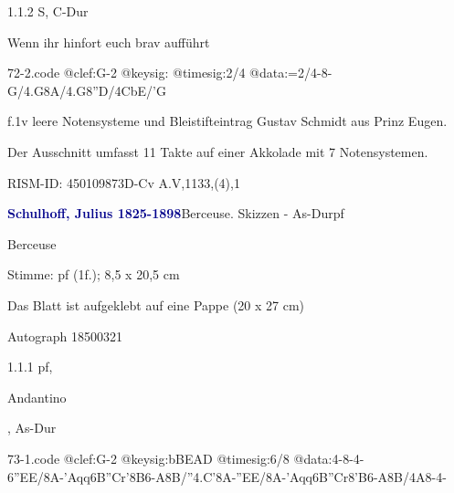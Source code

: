 \documentclass[a4paper, twocolumn, 11pt]{book}
\begin{document}
\newline %
\par 1.1.2  S, C-Dur\newline \begin{footnotesize} Wenn ihr hinfort euch brav aufführt \end{footnotesize}  
\begin{filecontents*}{72-2.code}
@clef:G-2
@keysig:
@timesig:2/4
@data:=2/4-8-G/4.G8A/4.G8''D/4CbE/'G
\end{filecontents*}

\newline %
\par f.1v leere Notensysteme und Bleistifteintrag {\textquotedbl}Gustav Schmidt aus Prinz Eugen.{\textquotedbl}
\par Der Ausschnitt umfasst 11 Takte auf einer Akkolade mit 7 Notensystemen.
\par RISM-ID: 450109873\newline D-Cv  A.V,1133,(4),1
\par \vspace{16pt} \textcolor{darkblue}{\textbf{Schulhoff, Julius  1825-1898}}\hfillplus{[73]}\newline Berceuse. Skizzen - As-Dur\newline pf
\par \begin{itshape} Berceuse\end{itshape} 
\par \textcolor{darkblue}{}  Stimme: pf  (1f.); 8,5 x 20,5 cm\newline \begin{small} Das Blatt ist aufgeklebt auf eine Pappe (20 x 27 cm)\end{small} \newline Autograph  18500321
\par 1.1.1  pf, \begin{itshape}Andantino\end{itshape}, As-Dur  
\begin{filecontents*}{73-1.code}
@clef:G-2
@keysig:bBEAD
@timesig:6/8
@data:4-8-4-6''{EE}/8A-'Aqq{6B''C}r{'8B6-A8B}/''4.C'8A-''{EE}/8A-'Aqq{6B''C}r{8'B6-A8B}/4A8-4-
\end{filecontents*}
\end{document}
